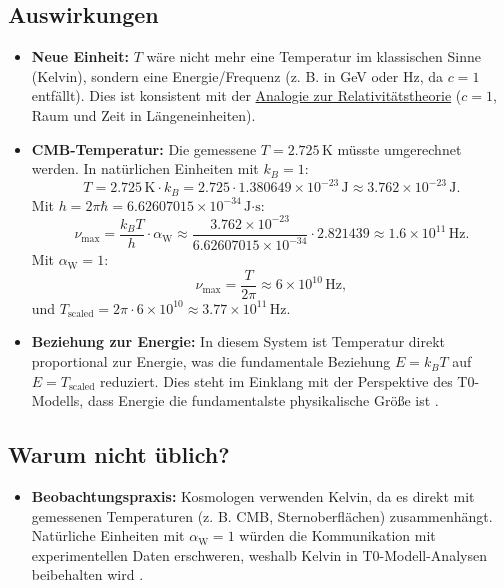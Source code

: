 \documentclass[12pt,a4paper]{article}
\newcommand{\alphaW}{\alpha_{\text{W}}}
\begin{document}
	\subsection{Auswirkungen}
    \begin{tcolorbox}[colback=blue!5!white,colframe=blue!75!black,title={Auswirkungen von $\alphaW = 1$}]		
	\begin{itemize}
			\item \textbf{Neue Einheit:} \(T\) wäre nicht mehr eine Temperatur im klassischen Sinne (Kelvin), sondern eine Energie/Frequenz (z. B. in GeV oder Hz, da \(c = 1\) entfällt). Dies ist konsistent mit der \href{https://github.com/jpascher/T0-Time-Mass-Duality/tree/main/2/pdf/Deutsch/ZeitRaumPascher.pdf}{Analogie zur Relativitätstheorie} (\(c = 1\), Raum und Zeit in Längeneinheiten).
			\item \textbf{CMB-Temperatur:} Die gemessene \(T = 2.725 \, \text{K}\) müsste umgerechnet werden. In natürlichen Einheiten mit \(k_B = 1\):
			\[
			T = 2.725 \, \text{K} \cdot k_B = 2.725 \cdot 1.380649 \times 10^{-23} \, \text{J} \approx 3.762 \times 10^{-23} \, \text{J}.
			\]
			Mit \(h = 2\pi \hbar = 6.62607015 \times 10^{-34} \, \text{J·s}\):
			\[
			\nu_{\text{max}} = \frac{k_B T}{h} \cdot \alphaW \approx \frac{3.762 \times 10^{-23}}{6.62607015 \times 10^{-34}} \cdot 2.821439 \approx 1.6 \times 10^{11} \, \text{Hz}.
			\]
			Mit \(\alphaW = 1\):
			\[
			\nu_{\text{max}} = \frac{T}{2\pi} \approx 6 \times 10^{10} \, \text{Hz},
			\]
			und \(T_{\text{scaled}} = 2\pi \cdot 6 \times 10^{10} \approx 3.77 \times 10^{11} \, \text{Hz}\).
			\item \textbf{Beziehung zur Energie:} In diesem System ist Temperatur direkt proportional zur Energie, was die fundamentale Beziehung \(E = k_B T\) auf \(E = T_{\text{scaled}}\) reduziert. Dies steht im Einklang mit der Perspektive des T0-Modells, dass Energie die fundamentalste physikalische Größe ist \cite{pascher_alpha_2025}.
		\end{itemize}
	\end{tcolorbox}
	
	\subsection{Warum nicht üblich?}
	
	\begin{itemize}
		\item \textbf{Beobachtungspraxis:} Kosmologen verwenden Kelvin, da es direkt mit gemessenen Temperaturen (z. B. CMB, Sternoberflächen) zusammenhängt. Natürliche Einheiten mit \(\alphaW = 1\) würden die Kommunikation mit experimentellen Daten erschweren, weshalb Kelvin in T0-Modell-Analysen beibehalten wird \cite{pascher_messdifferenzen_2025}.
	\end{itemize}
	
\end{document}
